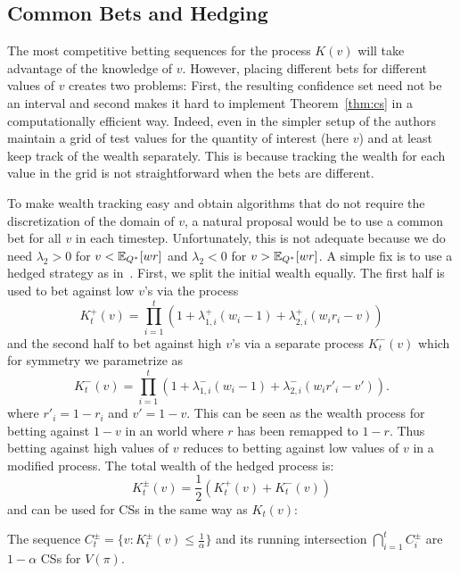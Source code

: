 \subsection{Common Bets and Hedging}
\label{sec:hedged}
The most competitive betting sequences for the process $K(v)$ will take
advantage of the knowledge of $v$. However, placing different bets for
different values of $v$ creates two problems: First, the resulting confidence
set need not be an interval and second makes it hard to implement
Theorem~\ref{thm:cs} in a computationally efficient way.  Indeed, even in the
simpler setup of \cite{waudby-smith_variance-adaptive_2020} the authors
maintain a grid of test values for the quantity of interest (here $v$)  and at
least keep track of the wealth separately.  This is because tracking the wealth
for each value in the grid is not straightforward when the bets are different. 

To make wealth tracking easy and obtain algorithms that do not require the
discretization of the domain of $v$, a natural proposal would be to use a
common bet for all $v$ in each timestep. Unfortunately, this is not adequate
because we do need $\lambda_2 > 0$ for $v<\mathbb{E}_{Q^*}[wr]$ and $\lambda_2 < 0$ for
$v>\mathbb{E}_{Q^*}[wr]$.  A simple fix is to use a hedged strategy as
in~\cite{waudby-smith_variance-adaptive_2020}.  First, we split the initial
wealth equally.  The first half is used to bet against low $v$'s via the process
\[
K_t^{+}(v) = \prod_{i=1}^t \left(1+\lambda_{1,i}^{+}(w_i-1)+\lambda_{2,i}^{+}(w_i r_i -v)\right)
\]
and the second half to bet against high $v$'s via a separate process
$K_t^{-}(v)$ which for symmetry we parametrize as
\[
K_t^{-}(v) = \prod_{i=1}^t \left(1+\lambda_{1,i}^{-}(w_i-1)+\lambda_{2,i}^{-}(w_i r'_i -v')\right).
\]
where $r'_i=1-r_i$ and $v'=1-v$.  This can be seen as the wealth process for
betting against $1-v$ in an world where $r$ has been remapped to $1-r$.  Thus
betting against high values of $v$ reduces to betting against low values of $v$
in a modified process. The total wealth of the hedged process is:
\begin{equation}
K_t^{\pm}(v) = \frac{1}{2} (K_t^{+}(v) + K_t^{-}(v))
\label{eq:hedged}
\end{equation}
and can be used for CSs in the same way as $K_t(v)$:
\begin{theorem}
\label{thm:hedged}
The sequence $C_t^{\pm} = \{v:K_t^{\pm}(v)\leq \frac{1}{\alpha}\}$ and its 
running intersection $\bigcap_{i=1}^t C_i^{\pm}$
are $1-\alpha$ CSs for $V(\pi)$.
\end{theorem}

